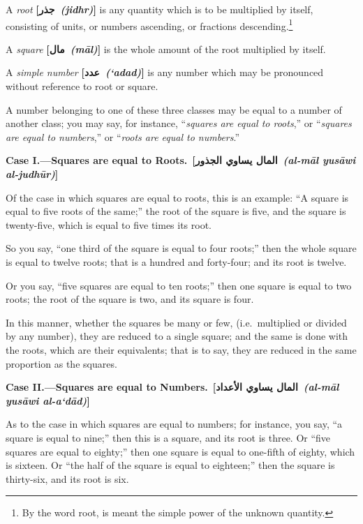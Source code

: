 A \textit{root} \textbf{[\arabicfont\beginR جذر\endR\ \textit{(jidhr)}]} is any quantity which is to be multiplied by itself, consisting of units, or numbers ascending, or fractions descending.\footnote{By the word root, is meant the simple power of the unknown quantity.}

A \textit{square} \textbf{[\arabicfont\beginR مال\endR\ \textit{(m\=al)}]} is the whole amount of the root multiplied by itself.

A \textit{simple number} \textbf{[\arabicfont\beginR عدد\endR\ \textit{(`adad)}]} is any number which may be pronounced without reference to root or square.

A number belonging to one of these three classes may be equal to a number of another class; you may say, for instance, ``\textit{squares are equal to roots},'' or ``\textit{squares are equal to numbers},'' or ``\textit{roots are equal to numbers}.''

\vspace{0.5cm}
\noindent\textbf{Case I.---Squares are equal to Roots.}\
\hfill\textbf{[\arabicfont\beginR المال يساوي الجذور\endR\ \textit{(al-m\=al yus\=awi al-judh\=ur)}]}

Of the case in which squares are equal to roots, this is an example: ``A square is equal to five roots of the same;'' the root of the square is five, and the square is twenty-five, which is equal to five times its root.

So you say, ``one third of the square is equal to four roots;'' then the whole square is equal to twelve roots; that is a hundred and forty-four; and its root is twelve.

Or you say, ``five squares are equal to ten roots;'' then one square is equal to two roots; the root of the square is two, and its square is four.

In this manner, whether the squares be many or few, (i.e.~multiplied or divided by any number), they are reduced to a single square; and the same is done with the roots, which are their equivalents; that is to say, they are reduced in the same proportion as the squares.

\vspace{0.3cm}
\noindent\textbf{Case II.---Squares are equal to Numbers.}\
\hfill\textbf{[\arabicfont\beginR المال يساوي الأعداد\endR\ \textit{(al-m\=al yus\=awi al-a`d\=ad)}]}

As to the case in which squares are equal to numbers; for instance, you say, ``a square is equal to nine;'' then this is a square, and its root is three. Or ``five squares are equal to eighty;'' then one square is equal to one-fifth of eighty, which is sixteen. Or ``the half of the square is equal to eighteen;'' then the square is thirty-six, and its root is six.

